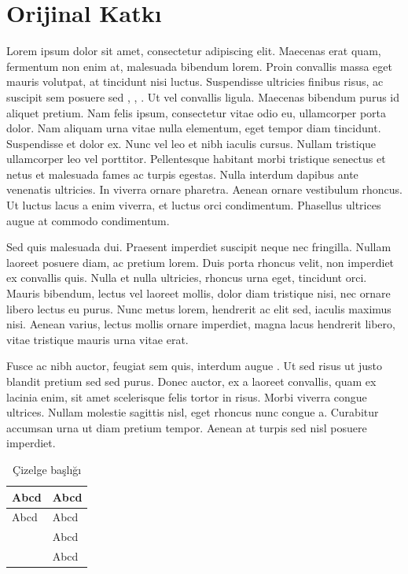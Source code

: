 \documentclass[a4paper,12pt]{report}
\begin{document}
\section{Orijinal Katkı} %
\label{sec:original}

Lorem ipsum dolor sit amet, consectetur adipiscing elit. Maecenas erat quam, fermentum non enim at, malesuada bibendum lorem. Proin convallis massa eget mauris volutpat, at tincidunt nisi luctus. Suspendisse ultricies finibus risus, ac suscipit sem posuere sed \cite{ref1}, \cite{ref2}, \cite{ref3}. Ut vel convallis ligula. Maecenas bibendum purus id aliquet pretium. Nam felis ipsum, consectetur vitae odio eu, ullamcorper porta dolor. Nam aliquam urna vitae nulla elementum, eget tempor diam tincidunt. Suspendisse et dolor ex. Nunc vel leo et nibh iaculis cursus. Nullam tristique ullamcorper leo vel porttitor. Pellentesque habitant morbi tristique senectus et netus et malesuada fames ac turpis egestas. Nulla interdum dapibus ante venenatis ultricies. In viverra ornare pharetra. Aenean ornare vestibulum rhoncus. Ut luctus lacus a enim viverra, et luctus orci condimentum. Phasellus ultrices augue at commodo condimentum.


\par
Sed quis malesuada dui. Praesent imperdiet suscipit neque nec fringilla. Nullam laoreet posuere diam, ac pretium lorem. Duis porta rhoncus velit, non imperdiet ex convallis quis. Nulla et nulla ultricies, rhoncus urna eget, tincidunt orci. Mauris bibendum, lectus vel laoreet mollis, dolor diam tristique nisi, nec ornare libero lectus eu purus. Nunc metus lorem, hendrerit ac elit sed, iaculis maximus nisi. Aenean varius, lectus mollis ornare imperdiet, magna lacus hendrerit libero, vitae tristique mauris urna vitae erat.

\par
Fusce ac nibh auctor, feugiat sem quis, interdum augue \cite{ref4}. Ut sed risus ut justo blandit pretium sed sed purus. Donec auctor, ex a laoreet convallis, quam ex lacinia enim, sit amet scelerisque felis tortor in risus. Morbi viverra congue ultrices. Nullam molestie sagittis nisl, eget rhoncus nunc congue a. Curabitur accumsan urna ut diam pretium tempor. Aenean at turpis sed nisl posuere imperdiet.

\begin{table}[h]
\centering
\caption{Çizelge başlığı}
\label{tab:label}
\begin{tabular}{|l|l|}
\hline
 Abcd     & Abcd           \\ \hline
Abcd     & Abcd           \\
              & Abcd  \\
              & Abcd          \\ \hline
\end{tabular}

\end{table}
\end{document}
